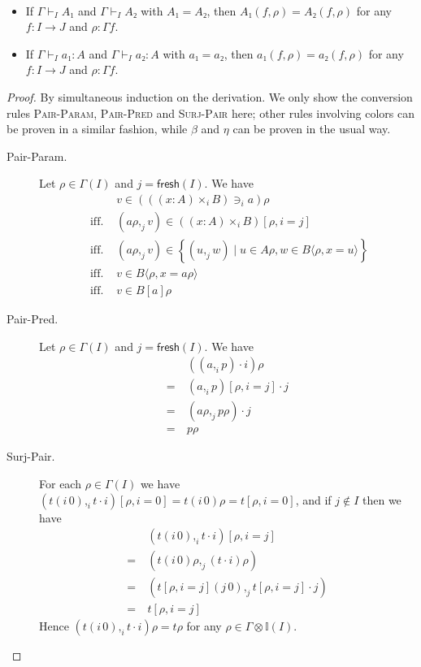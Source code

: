 \documentclass[english]{PaperTools/latex/lipics}
\newcommand\CTimes[2]{(#2) ×_{#1}}
\newcommand\param[1]{\!\cdot\!#1}
\newcommand\op[1]{∋_{#1}}
\def\fresh#1{\mathsf{fresh}(#1)}
\begin{document}
\begin{theorem}~
  \label{thm:convertible-in-model}
  \begin{itemize}
    \item If $Γ ⊢_I A₁$ and $Γ ⊢_I A₂$ with $A₁ = A₂$, then
      $A₁(f,ρ) = A₂(f,ρ)$ for any $f : I → J$ and $ρ : Γf$.
    \item If $Γ ⊢_I a₁ : A$ and $Γ ⊢_I a₂ : A$ with $a₁ = a₂$, then
      $a₁(f,ρ) = a₂(f,ρ)$ for any $f : I → J$ and $ρ : Γf$.
  \end{itemize}
\end{theorem}
\begin{proof}
  By simultaneous induction on the derivation.
  We only show the conversion rules \textsc{Pair-Param},
  \textsc{Pair-Pred} and \textsc{Surj-Pair} here; other rules involving
  colors can be proven in a similar fashion, while $β$ and $η$ can be
  proven in the usual way.

  \begin{description}
    \item[\sc Pair-Param.]
      Let $ρ ∈ Γ(I)$ and $j = \fresh I$.  We have
      \begin{align*}
        &v ∈ ({((x:A)\times_i B)} \op {i} a)ρ
        \\
        \text{ iff. }& (aρ ,_j v) ∈ (\CTimes i {x:A} B)[ρ,i=j]
        \\
        \text{ iff. }& (aρ ,_j v) ∈ \left\{ (u ,_j w) \mid u ∈ Aρ, w ∈ B⟨ρ,x=u⟩ \right\}
        \\
        \text{ iff. }& v ∈ B⟨ρ,x=aρ⟩
        \\
        \text{ iff. }& v ∈ B[a]ρ
      \end{align*}

    \item[\sc Pair-Pred.]
      Let $ρ ∈ Γ(I)$ and $j = \fresh I$.  We have
      \begin{align*}
         & ((a ,_i p) \param i)ρ
        \\=~& (a ,_i p)[ρ,i=j]·j
      \\=~& (aρ ,_j pρ) · j
      \\=~& pρ
      \end{align*}

    \item[\sc Surj-Pair.]
      For each $ρ ∈ Γ(I)$ we have
      $(t(i\,0) ,_i t·i)[ρ,i=0] = t(i\,0)ρ = t[ρ,i=0]$, and
      if $j ∉ I$ then we have
      \begin{align*}
        & (t(i\,0) ,_i t·i)[ρ,i=j]
        \\=~& (t(i\,0)ρ ,_j (t·i)ρ)
        \\=~& (t[ρ,i=j](j\,0) ,_j t[ρ,i=j]·j)
        \\=~& t[ρ,i=j]
      \end{align*}
      Hence $(t(i\,0) ,_i t·i)ρ = tρ$ for any $ρ ∈ Γ⊗𝕀(I)$.
      \qedhere
  \end{description}
\end{proof}
\end{document}
